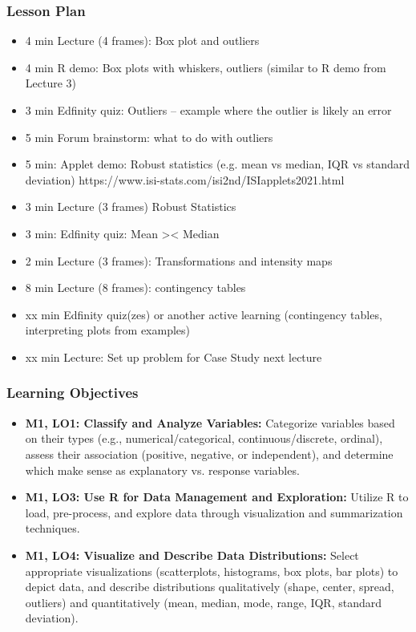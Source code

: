 \begin{frame}
    \frametitle{Lesson Plan}
    \begin{itemize}
        \item 4 min Lecture (4 frames): Box plot and outliers
        \item 4 min R demo: Box plots with whiskers, outliers (similar to R demo from Lecture 3)
        \item 3 min Edfinity quiz: Outliers -- example where the outlier is likely an error
        \item 5 min Forum brainstorm: what to do with outliers
        \item 5 min: Applet demo: Robust statistics (e.g. mean vs median, IQR vs standard deviation) https://www.isi-stats.com/isi2nd/ISIapplets2021.html
        \item 3 min Lecture (3 frames) Robust Statistics 
        \item 3 min: Edfinity quiz: Mean >< Median
        \item 2 min Lecture (3 frames): Transformations and intensity maps
        \item 8 min Lecture (8 frames): contingency tables
        \item xx min Edfinity quiz(zes) or another active learning (contingency tables, interpreting plots from examples)
        \item xx min Lecture: Set up problem for Case Study next lecture
    \end{itemize}
\end{frame}

\begin{frame}
    \frametitle{Learning Objectives}
    \begin{itemize}
        \item \textbf{M1, LO1: Classify and Analyze Variables:} Categorize variables based on their types (e.g., numerical/categorical, continuous/discrete, ordinal), assess their association (positive, negative, or independent), and determine which make sense as explanatory vs. response variables.
        \item \textbf{M1, LO3: Use R for Data Management and Exploration:} Utilize R to load, pre-process, and explore data through visualization and summarization techniques.
        \item \textbf{M1, LO4: Visualize and Describe Data Distributions:} Select appropriate visualizations (scatterplots, histograms, box plots, bar plots) to depict data, and describe distributions qualitatively (shape, center, spread, outliers) and quantitatively (mean, median, mode, range, IQR, standard deviation).
    \end{itemize}
\end{frame}

